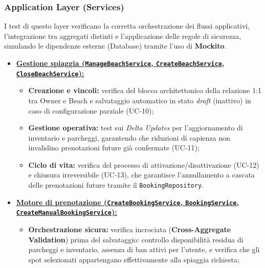\documentclass[a4paper,11pt]{article}
\begin{document}
\vspace{0.5cm}

\subsubsection*{Application Layer (Services)}
I test di questo layer verificano la corretta orchestrazione dei flussi applicativi, l'integrazione tra aggregati distinti e l'applicazione delle regole di sicurezza, simulando le dipendenze esterne (Database) tramite l'uso di \textbf{Mockito}.

\begin{itemize}[leftmargin=*]
	\item \underline{\textbf{Gestione spiaggia (\texttt{ManageBeachService}, \texttt{CreateBeachService}, \texttt{CloseBeachService}):}}
	\label{itm:application_beach}
	\begin{itemize}[nosep]
		\item \textbf{Creazione e vincoli:} verifica del blocco architettonico della relazione 1:1 tra Owner e Beach e salvataggio automatico in stato \textit{draft} (inattivo) in caso di configurazione parziale (UC-10);
		
		\item \textbf{Gestione operativa:} test sui \textit{Delta Updates} per l'aggiornamento di inventario e parcheggi, garantendo che riduzioni di capienza non invalidino prenotazioni future già confermate (UC-11);
		
		\item \textbf{Ciclo di vita:} verifica del processo di attivazione/disattivazione (UC-12) e chiusura irreversibile (UC-13), che garantisce l'annullamento a cascata delle prenotazioni future tramite il \texttt{BookingRepository}.
	\end{itemize}
	
	\item \textbf{\underline{Motore di prenotazione (\texttt{CreateBookingService}, \texttt{BookingService},}} \\ \underline{\textbf{\texttt{CreateManualBookingService}):}}
	\label{itm:application_booking}
	\begin{itemize}[nosep]
		\item \textbf{Orchestrazione sicura:} verifica incrociata (\textbf{Cross-Aggregate Validation}) prima del salvataggio: controllo disponibilità residua di parcheggi e inventario, assenza di ban attivi per l'utente, e verifica che gli spot selezionati appartengano effettivamente alla spiaggia richiesta;
		

\end{itemize}
\end{itemize}
\end{document}
